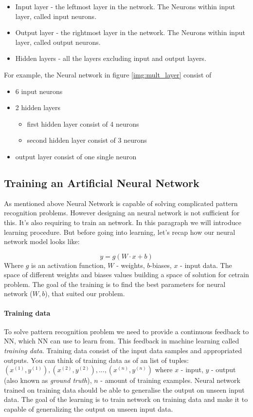\begin{itemize}
	\item Input layer - the leftmost layer in the network. The Neurons within
		input layer, called input neurons.
	\item Output layer - the rightmost layer in the network. The Neurons within
		input layer, called output neurons.
	\item Hidden layers - all the layers excluding input and output layers.
\end{itemize}

For example, the Neural network in figure \ref{img:mult_layer} consist of

\begin{itemize}
	\item 6 input neurons
	\item 2 hidden layers
		\begin{itemize}
			\item first hidden layer consist of 4 neurons
			\item second hidden layer consist of 3 neurons
		\end{itemize}
	\item output layer consist of one single neuron
\end{itemize}


\subsection{Training an Artificial Neural Network}
As mentioned above Neural Network is capable of solving complicated
pattern recognition problems. However designing an neural network is not sufficient
for this. It's also requiring to train an network. In this paragraph we will
introduce learning procedure. But before going into learning, let's recap
how our neural network model looks like:

\begin{equation} \label{eq:nn}
	y = g(W \cdot x + b)
\end{equation}
Where $g$ is an activation function, $W$ - weights, $b$-biases, $x$ - input data.
The space of different weights and biases values building a space of solution for
cetrain problem. The goal of the training is to find the best parameters
for neural network ($W, b$), that suited our problem.

\paragraph{Training data} To solve pattern recognition problem we need to provide
a continuous feedback to NN, which NN can use to learn from. This feedback
in machine learning called \emph{training data}.
Training data consist of the input data samples
and appropriated outputs. You can think of training data as of an list of tuples:
${{(x^{(1)}, y^{(1)}), (x^{(2)}, y^{(2)}), ..., (x^{(n)}, y^{(n)})}}$ where $x$ - input,
$y$ - output (also known as \emph{ground truth}), $n$ - amount of training examples. Neural network trained on training data
should be able to generalise the output on unseen input data.
The goal of the learning is to train network on training data and make it to capable of generalizing the output on unseen input data.

